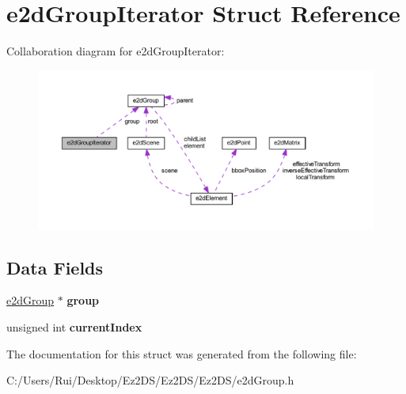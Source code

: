 \hypertarget{structe2d_group_iterator}{\section{e2d\-Group\-Iterator Struct Reference}
\label{structe2d_group_iterator}
}


Collaboration diagram for e2d\-Group\-Iterator\-:\nopagebreak
\begin{figure}[H]
\begin{center}
\leavevmode
\includegraphics[width=350pt]{structe2d_group_iterator__coll__graph}
\end{center}
\end{figure}
\subsection*{Data Fields}
\begin{DoxyCompactItemize}
\item 
\hypertarget{structe2d_group_iterator_a13e9c2162587f7af49d2ceb78c380444}{\hyperlink{structe2d_group}{e2d\-Group} $\ast$ {\bfseries group}}\label{structe2d_group_iterator_a13e9c2162587f7af49d2ceb78c380444}

\item 
\hypertarget{structe2d_group_iterator_a932f59c8e81a171eb21af8d204d1c13d}{unsigned int {\bfseries current\-Index}}\label{structe2d_group_iterator_a932f59c8e81a171eb21af8d204d1c13d}

\end{DoxyCompactItemize}


The documentation for this struct was generated from the following file\-:\begin{DoxyCompactItemize}
\item 
C\-:/\-Users/\-Rui/\-Desktop/\-Ez2\-D\-S/\-Ez2\-D\-S/\-Ez2\-D\-S/e2d\-Group.\-h\end{DoxyCompactItemize}
